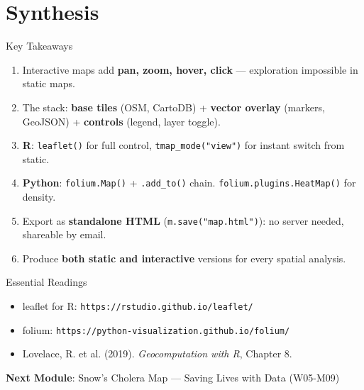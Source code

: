 \documentclass[10pt]{beamer}
\begin{document}
\section{Synthesis}
\begin{frame}{Key Takeaways}
\begin{enumerate}
\item Interactive maps add \textbf{pan, zoom, hover, click} --- exploration impossible in static maps.
\item The stack: \textbf{base tiles} (OSM, CartoDB) + \textbf{vector overlay} (markers, GeoJSON) + \textbf{controls} (legend, layer toggle).
\item \textbf{R}: \texttt{leaflet()} for full control, \texttt{tmap\_mode("view")} for instant switch from static.
\item \textbf{Python}: \texttt{folium.Map()} + \texttt{.add\_to()} chain. \texttt{folium.plugins.HeatMap()} for density.
\item Export as \textbf{standalone HTML} (\texttt{m.save("map.html")}): no server needed, shareable by email.
\item Produce \textbf{both static and interactive} versions for every spatial analysis.
\end{enumerate}
\end{frame}
\begin{frame}{Essential Readings}
\begin{itemize}
\item leaflet for R: \texttt{https://rstudio.github.io/leaflet/}
\item folium: \texttt{https://python-visualization.github.io/folium/}
\item Lovelace, R. et al. (2019). \emph{Geocomputation with R}, Chapter 8.
\end{itemize}
\vspace{6pt}
\textbf{Next Module}: Snow's Cholera Map --- Saving Lives with Data (W05-M09)
\end{frame}
\end{document}
